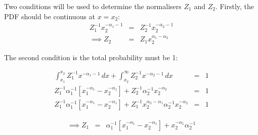 \documentclass[letterpaper, 11pt]{article}
\begin{document}
Two conditions will be used to determine the normalisers $Z_1$ and $Z_2$.
Firstly, the PDF should be continuous at $x=x_2$:
\begin{eqnarray}
Z_1^{-1}x_2^{-\alpha_1 - 1} &=& Z_2^{-1}x_2^{-\alpha_2 - 1}\\
\implies
Z_2 &=& Z_1x_2^{\alpha_1-\alpha_2}
\end{eqnarray}

The second condition is the total probability must be 1:

\begin{eqnarray}
\int_{x_1}^{x_2} Z_1^{-1} x^{-\alpha_1 - 1} \, dx
+
\int_{x_2}^\infty Z_2^{-1} x^{-\alpha_2 - 1} \, dx
&=& 1 \\
Z_1^{-1}\alpha_1^{-1}\left[x_1^{-\alpha_1} - x_2^{-\alpha_1}\right]
+
Z_2^{-1}\alpha_2^{-1}x_2^{-\alpha_2}
&=& 1 \\
Z_1^{-1}\alpha_1^{-1}\left[x_1^{-\alpha_1} - x_2^{-\alpha_1}\right]
+
Z_1^{-1}x_2^{\alpha_2-\alpha_1}\alpha_2^{-1}x_2^{-\alpha_2}
&=& 1
\end{eqnarray}

\begin{eqnarray}
\implies
Z_1 &=& \alpha_1^{-1}\left[x_1^{-\alpha_1} - x_2^{-\alpha_1}\right]
+
x_2^{-\alpha_1}\alpha_2^{-1}
\end{eqnarray}






\end{document}
